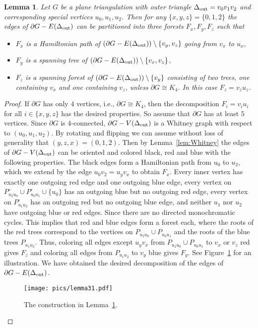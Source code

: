 \documentclass[a4paper,10pt]{article}
\theoremstyle{plain}
\newtheorem{lem}[thm]{Lemma}
\newcommand{\inner}[1]{{#1}^{\circ}}
\renewcommand{\outer}[1]{\partial{#1}}
\begin{document}
\begin{lem}\label{lem:inner-decomposition}
 Let $G$ be a plane triangulation with outer triangle $\Delta_{\rm out} = v_0v_1v_2$ and corresponding special vertices $u_0,u_1,u_2$.
 Then for any $\{x,y,z\}= \{0,1,2\}$ the edges of $\outer{G} - E(\Delta_{\rm out})$ can be partitioned into three forests $F_x,F_y,F_z$ such that
 \begin{itemize}
  \item $F_x$ is a Hamiltonian path of $(\outer{G}- E(\Delta_{\rm out}))\setminus\{v_y,v_z\}$ going from $v_x$ to $u_x$,
  
  \item $F_y$ is a spanning tree of $(\outer{G}- E(\Delta_{\rm out}))\setminus\{v_x,v_z\}$,
  
  \item $F_z$ is a spanning forest of $(\outer{G}- E(\Delta_{\rm out}))\setminus\{v_y\}$ consisting of two trees, one containing $v_x$ and one containing $v_z$, unless $\outer{G}\cong K_4$. In this case $F_z=v_zu_z$.
 \end{itemize}
\end{lem}
% 
\begin{proof}
 If $\outer{G}$ has only $4$ vertices, i.e., $\outer{G}\cong K_4$, then the decomposition $F_i=v_iu_i$ for all  $i\in\{x,y,z\}$ has the desired properties. So assume that $\outer{G}$ has at least $5$ vertices.
 Since $\outer{G}$ is $4$-connected, $\outer{G} - V(\Delta_{\rm out})$ is a Whitney graph with respect to $(u_0,u_1,u_2)$. By rotating and flipping we can assume without loss of generality that $(y,z,x) = (0,1,2)$. Then by Lemma~\ref{lem:Whitney} the edges of $\outer{G}- V(\Delta_{\rm out})$ can be oriented and colored black, red and blue with the following properties. The black edges form a Hamiltonian path from $u_0$ to $u_2$, which we extend by the edge $u_0v_2=u_yv_x$ to obtain $F_x$. Every inner vertex has exactly one outgoing red edge and one outgoing blue edge, every vertex on $\inner{P}_{u_2u_0}\cup\inner{P}_{u_0u_1}\cup\{u_0\}$ has an outgoing blue but no outgoing red edge, every vertex on $\inner{P}_{u_1u_2}$ has an outgoing red but no outgoing blue edge, and neither $u_1$ nor $u_2$ have outgoing blue or red edges. Since there are no directed monochromatic cycles. This implies that red and blue edges form a forest each, where the roots of the red trees correspond to the vertices on ${P}_{u_2u_0}\cup{P}_{u_0u_1}$ and the roots of the blue trees ${P}_{u_1u_2}$. Thus, coloring all edges except $u_yv_x$ from ${P}_{u_2u_0}\cup{P}_{u_0u_1}$ to $v_x$ or $v_z$ red gives $F_z$ and coloring all edges from ${P}_{u_1u_2}$ to $v_y$ blue gives $F_y$. See Figure~\ref{fig:lemma31} for an illustration. We have obtained the desired decomposition of the edges of $\outer{G} - E(\Delta_{\rm out})$.
% 
 \begin{figure}[tb]
  \centering
  \texttt{[image: pics/lemma31.pdf]}
  \caption{The construction in Lemma~\ref{lem:inner-decomposition}.}
  \label{fig:lemma31}
 \end{figure}
%   
\end{proof}
\end{document}
